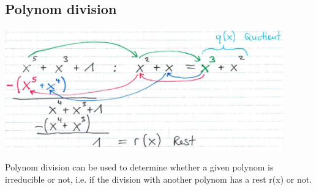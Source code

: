 \subsection{Polynom division}
\begin{minipage}{12.5cm}
	\includegraphics[width=12cm]{./bilder/polynomdivision.png}\\
\end{minipage}
\begin{minipage}{6cm}
	Polynom division can be used to determine whether a given polynom is irreducible or not, i.e. if the division with another polynom has a rest r(x) or not.
\end{minipage}


